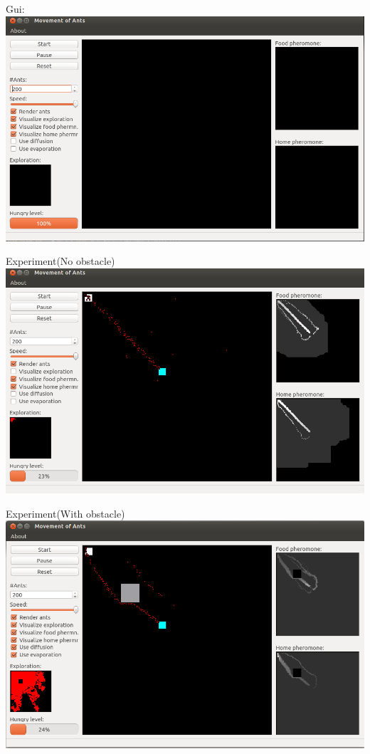 \documentclass{beamer}
\begin{document}
\begin{frame}
Gui:\\
\vspace{0.3cm}
\includegraphics[width=1.0\textwidth]{gui.png}
\end{frame}


\begin{frame}
Experiment(No obstacle)\\
\vspace{0.3cm}
\includegraphics[width=1.0\textwidth]{noObstacle.png}
\end{frame}


\begin{frame}
Experiment(With obstacle)\\
\vspace{0.3cm}
\includegraphics[width=1.0\textwidth]{obstacle.png}
\end{frame}
\end{document}
